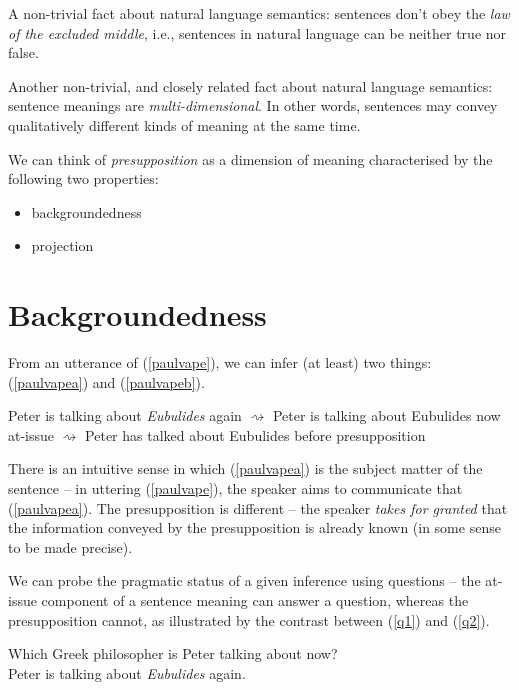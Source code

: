 \documentclass[cronos,landscape,paper=letter]{ling-handout}
\begin{document}
A non-trivial fact about natural language semantics: sentences don't obey the \textit{law of the excluded middle}, i.e., sentences in natural language can be neither true nor false.

Another non-trivial, and closely related fact about natural language semantics: sentence meanings are \textit{multi-dimensional}. In other words, sentences may convey qualitatively different kinds of meaning at the same time.

We can think of \textit{presupposition} as a dimension of meaning characterised by the following two properties:

\begin{itemize}

  \item backgroundedness

  \item projection

\end{itemize}

\section{Backgroundedness}

From an utterance of (\ref{paulvape}), we can infer (at least) two things: (\ref{paulvapea}) and (\ref{paulvapeb}).

\pex\label{paulvape}
Peter is talking about \textit{Eubulides} again
\a\label{paulvapea}\(⇝\) \textsf{Peter is talking about Eubulides now} \hfill at-issue
\a\label{paulvapeb}\(⇝\) \textsf{Peter has talked about Eubulides before} \hfill presupposition
\xe

There is an intuitive sense in which (\ref{paulvapea}) is the subject matter of the sentence -- in uttering (\ref{paulvape}), the speaker aims to communicate that (\ref{paulvapea}). The presupposition is different -- the speaker \textit{takes for granted} that the information conveyed by the presupposition is already known (in some sense to be made precise).

We can probe the pragmatic status of a given inference using questions -- the at-issue component of a sentence meaning can answer a question, whereas the presupposition cannot, as illustrated by the contrast between (\ref{q1}) and (\ref{q2}).

\ex\label{q1}
Which Greek philosopher is Peter talking about now?\\
\ljudge{\cmark} Peter is talking about \textit{Eubulides} again.
\xe
\end{document}
